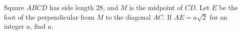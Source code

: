 Square $ABCD$ has side length $28$, and $M$ is the midpoint of $\overline{CD}$. Let $E$ be the foot of the perpendicular from $M$ to the diagonal $\overline{AC}$. If $AE=a\sqrt2$ for an integer $a$, find $a$.
